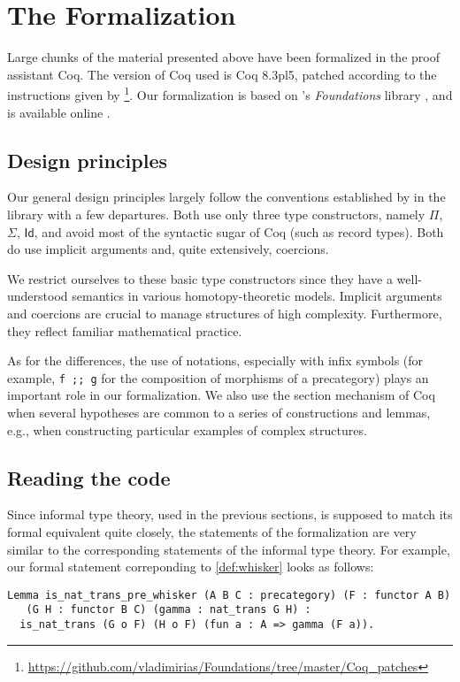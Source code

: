 
\section{The Formalization}
\label{sec:formalization}

Large chunks of the material presented above have been formalized in the proof assistant \textsf{Coq}.
The version of \textsf{Coq} used is \textsf{Coq} 8.3pl5, patched according to the instructions given by
\citeauthor{vv_foundations}\footnote{\url{https://github.com/vladimirias/Foundations/tree/master/Coq_patches}}.
Our formalization is based on \citeauthor{vv_foundations}'s \emph{Foundations} library \parencite{vv_foundations},
and is available online \parencite{rezk_coq}.


\subsection*{Design principles}
Our general design principles largely follow the conventions established by \citeauthor{vv_foundations} in the library \cite{vv_foundations} 
with a few departures. 
Both use only three type constructors, namely $\Pi$, $\Sigma$, $\textsf{Id}$, and avoid most of the syntactic sugar of \textsf{Coq} (such as record types).
Both do use implicit arguments and, quite extensively, coercions.

We restrict ourselves to these basic type constructors since they have a well-understood
semantics in various homotopy-theoretic models. Implicit arguments and coercions are 
crucial to manage structures of high complexity. Furthermore, they reflect
 familiar mathematical practice.


As for the differences, the use of notations, especially with infix symbols (for example, \lstinline!f ;; g! for 
the composition of morphisms of a precategory) plays an important role in our formalization. 
We also use the section mechanism of \textsf{Coq} 
when several hypotheses are common to a series of constructions and lemmas, e.g., 
when constructing particular examples of complex structures.

\subsection*{Reading the code}

Since informal type theory, used in the previous sections, is supposed to match its formal equivalent quite closely, 
the statements of the formalization are very similar to the corresponding statements of the informal type theory. 
For example, our formal statement correponding to \autoref{def:whisker} looks as follows:
\begin{lstlisting}
Lemma is_nat_trans_pre_whisker (A B C : precategory) (F : functor A B)
   (G H : functor B C) (gamma : nat_trans G H) :
  is_nat_trans (G o F) (H o F) (fun a : A => gamma (F a)).
\end{lstlisting}


